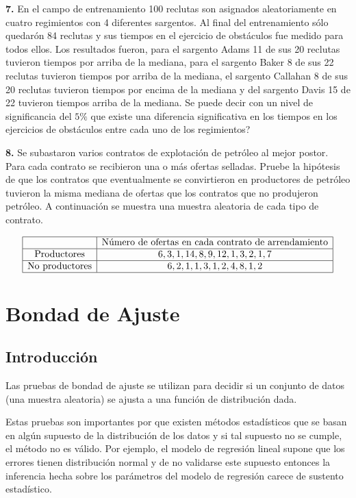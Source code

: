 \documentclass[
  a4paper,
  oneside,
  openany]{book}
\begin{document}
\textbf{7.} En el campo de entrenamiento 100 reclutas son asignados aleatoriamente en cuatro regimientos con 4 diferentes sargentos. Al final del entrenamiento sólo quedarón 84 reclutas y sus tiempos en el ejercicio de obstáculos fue medido para todos ellos. Los resultados fueron, para el sargento Adams 11 de sus 20 reclutas tuvieron tiempos por arriba de la mediana, para el sargento Baker 8 de sus 22 reclutas tuvieron tiempos por arriba de la mediana, el sargento Callahan 8 de sus 20 reclutas tuvieron tiempos por encima de la mediana y del sargento Davis 15 de 22 tuvieron tiempos arriba de la mediana. Se puede decir con un nivel de significancia del \(5\%\) que existe una diferencia significativa en los tiempos en los ejercicios de obstáculos entre cada uno de los regimientos?

\textbf{8.} Se subastaron varios contratos de explotación de petróleo al mejor postor. Para cada contrato se recibieron una o más ofertas selladas. Pruebe la hipótesis de que los contratos que eventualmente se convirtieron en productores de petróleo tuvieron la misma mediana de ofertas que los contratos que no produjeron petróleo. A continuación se muestra una muestra aleatoria de cada tipo de contrato.

\[
\begin{array}{|c | c |}
\hline
&\mbox{Número de ofertas en cada contrato de arrendamiento} \\
   \hline
\mbox{Productores}& 6, 3, 1, 14, 8, 9, 12, 1, 3, 2, 1, 7  \\
  \hline
\mbox{No  productores}&6, 2, 1, 1, 3, 1, 2, 4, 8, 1, 2\\
    \hline
\end{array}
\]

\hypertarget{part-bondad-de-ajuste}{%
\part{Bondad de Ajuste}\label{part-bondad-de-ajuste}}

\hypertarget{introducciuxf3n-4}{%
\chapter*{Introducción}\label{introducciuxf3n-4}}


Las pruebas de bondad de ajuste se utilizan para decidir si un conjunto de datos (una muestra aleatoria) se ajusta a una función de distribución dada.

Estas pruebas son importantes por que existen métodos estadísticos que se basan en algún supuesto de la distribución de los datos y si tal supuesto no se cumple, el método no es válido. Por ejemplo, el modelo de regresión lineal supone que los errores tienen distribución normal y de no validarse este supuesto entonces la inferencia hecha sobre los parámetros del modelo de regresión carece de sustento estadístico.
\end{document}
